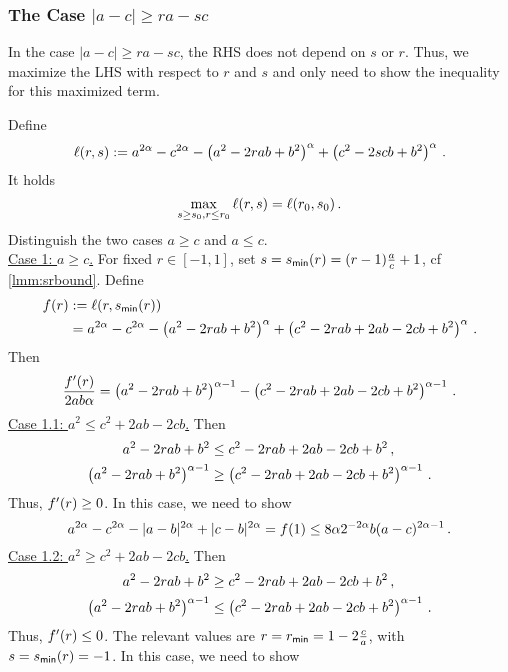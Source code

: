 \subsubsection{The Case $|a-c| \geq ra-sc$}\label{ssec:acgreasc}
%
In the case $|a-c| \geq ra-sc$, the RHS does not depend on $s$ or $r$. Thus, we maximize the LHS with respect to $r$ and $s$ and only need to show the inequality for this maximized term.

Define
\begin{equation*}
	\ell(r,s) := a^{2\alpha}-c^{2\alpha}-\left( a^2-2rab+b^2 \right)^\alpha+\left( c^2-2scb+b^2 \right)^\alpha 
	\, .
\end{equation*}
It holds
\begin{equation*}
	\max_{s\geq s_0, r\leq r_0} \ell(r,s) = \ell(r_0,s_0)
	\, .
\end{equation*}
Distinguish the two cases $a\geq c$ and $a\leq c$.\\
\underline{Case 1: $a\geq c$.} For fixed $r\in[-1,1]$, set $s = s_{\mathsf{min}}(r) = (r-1) \frac ac+1$, cf \autoref{lmm:srbound}. Define
\begin{align*}
	f(r) &:= \ell(r,s_{\mathsf{min}}(r)) 
	\\&= a^{2\alpha}-c^{2\alpha}-\left( a^2-2rab+b^2 \right)^\alpha+\left( c^2-2rab+2ab-2cb+b^2 \right)^\alpha
	\, .
\end{align*}
Then
\begin{equation*}
	\frac{f^\prime(r)}{2ab\alpha} = \left( a^2-2rab+b^2 \right)^{\alpha-1} - \left( c^2-2rab+2ab-2cb+b^2 \right)^{\alpha-1}
	\, .
\end{equation*}
\underline{Case 1.1: $a^2 \leq c^2+2ab-2cb$.} Then
\begin{align*}
	a^2-2rab+b^2 &\leq c^2-2rab+2ab-2cb+b^2\, ,\\
	\left( a^2-2rab+b^2 \right)^{\alpha-1} &\geq \left( c^2-2rab+2ab-2cb+b^2 \right)^{\alpha-1}
	\, .
\end{align*}
Thus, $f^\prime(r)\geq0$. In this case, we need to show
\begin{equation*}
	a^{2\alpha}-c^{2\alpha}-|a-b|^{2\alpha}+|c-b|^{2\alpha} = f(1) \leq 8\alpha 2^{-2\alpha} b (a-c)^{2\alpha-1}
	\, .
\end{equation*}
\underline{Case 1.2: $a^2 \geq c^2+2ab-2cb$.} Then
\begin{align*}
	a^2-2rab+b^2 &\geq c^2-2rab+2ab-2cb+b^2\, ,\\
	\left( a^2-2rab+b^2 \right)^{\alpha-1} &\leq \left( c^2-2rab+2ab-2cb+b^2 \right)^{\alpha-1}\, .
\end{align*}
Thus, $f^\prime(r)\leq0$. The relevant values are $r = r_{\mathsf{min}} = 1-2\frac ca$, with $s = s_{\mathsf{min}}(r) = -1$. In this case, we need to show
